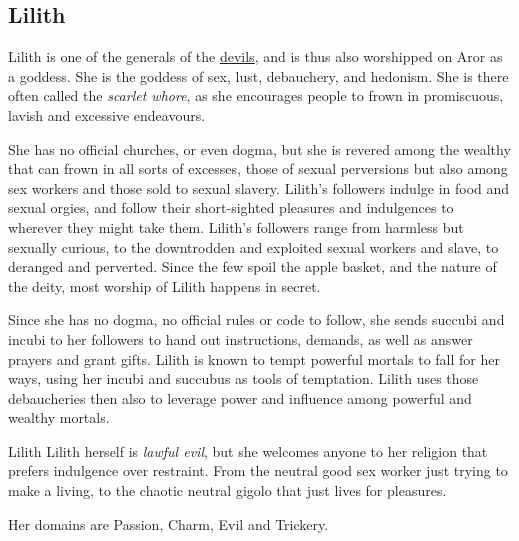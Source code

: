 \subsection{Lilith}
\label{sec:Lilith}

Lilith is one of the generals of the \hyperref[sec:Devils]{devils}, and is
thus also worshipped on Aror as a goddess. She is the goddess of sex, lust,
debauchery, and hedonism. She is there often called the \emph{scarlet whore},
as she encourages people to frown in promiscuous, lavish and excessive
endeavours.

She has no official churches, or even dogma, but she is revered among the
wealthy that can frown in all sorts of excesses, those of sexual perversions
but also among sex workers and those sold to sexual slavery. Lilith's followers
indulge in food and sexual orgies, and follow their short-sighted pleasures
and indulgences to wherever they might take them. Lilith's followers range
from harmless but sexually curious, to the downtrodden and exploited sexual
workers and slave, to deranged and perverted. Since the few spoil the apple
basket, and the nature of the deity, most worship of Lilith happens in secret.

Since she has no dogma, no official rules or code to follow, she sends succubi
and incubi to her followers to hand out instructions, demands, as well as
answer prayers and grant gifts. Lilith is known to tempt powerful mortals to
fall for her ways, using her incubi and succubus as tools of temptation. Lilith
uses those debaucheries then also to leverage power and influence among powerful
and wealthy mortals.

\begin{35e}{Lilith}
  Lilith herself is \emph{lawful evil}, but she welcomes anyone to her religion
  that prefers indulgence over restraint. From the neutral good sex worker just
  trying to make a living, to the chaotic neutral gigolo that just lives for
  pleasures.

  Her domains are Passion, Charm, Evil and Trickery.
\end{35e}
